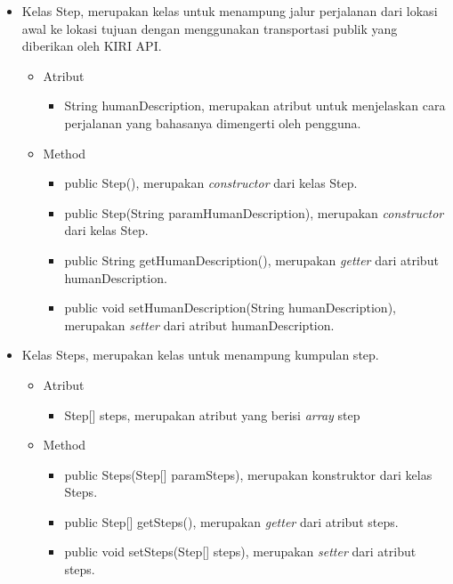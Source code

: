 \begin{itemize}
		\item Kelas Step, merupakan kelas untuk menampung jalur perjalanan dari lokasi awal ke lokasi tujuan dengan menggunakan transportasi publik yang diberikan oleh KIRI API.
		
		
				\begin{itemize}
							\item Atribut
					
					
									\begin{itemize}
												\item String humanDescription, merupakan atribut untuk menjelaskan cara perjalanan yang bahasanya dimengerti oleh pengguna.
									\end{itemize}
					
							\item Method
					
					
									\begin{itemize}
												\item public Step(), merupakan \textit{constructor} dari kelas Step.
												\item public Step(String paramHumanDescription), merupakan \textit{constructor} dari kelas Step.
												\item public String getHumanDescription(), merupakan \textit{getter} dari atribut humanDescription.
												\item public void setHumanDescription(String humanDescription), merupakan \textit{setter} dari atribut humanDescription.
									\end{itemize}
				\end{itemize}
		
		\item Kelas Steps, merupakan kelas untuk menampung kumpulan step.
		
		
				\begin{itemize}
							\item Atribut
					
					
									\begin{itemize}
												\item Step[] steps, merupakan atribut yang berisi \textit{array} step
									\end{itemize}
					
							\item Method
					
					
									\begin{itemize}
												\item public Steps(Step[] paramSteps), merupakan konstruktor dari kelas Steps.
												\item public Step[] getSteps(), merupakan \textit{getter} dari atribut steps.
												\item public void setSteps(Step[] steps), merupakan \textit{setter} dari atribut steps.
									\end{itemize}
				\end{itemize}
\end{itemize}




